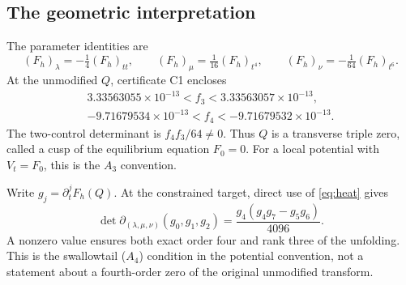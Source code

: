 \documentclass[11pt,a4paper]{article}
\numberwithin{equation}{section}
\theoremstyle{remark}\newtheorem{remark}[theorem]{Remark}
\begin{document}
\subsection{The geometric interpretation}
The parameter identities are
\begin{equation}
 (F_h)_\lambda=-\tfrac14(F_h)_{tt},\qquad
 (F_h)_\mu=\tfrac1{16}(F_h)_{t^4},\qquad
 (F_h)_\nu=-\tfrac1{64}(F_h)_{t^6}.\label{eq:heat}
\end{equation}
At the unmodified $Q$, certificate C1 encloses
\begin{equation}
 \begin{gathered}
 3.33563055\times10^{-13}<f_3<3.33563057\times10^{-13},\\
 -9.71679534\times10^{-13}<f_4<-9.71679532\times10^{-13}.
 \end{gathered}
\end{equation}
The two-control determinant is $f_4f_3/64\ne0$. Thus $Q$ is a transverse
triple zero, called a cusp of the equilibrium equation $F_0=0$.
For a local potential with $V_t=F_0$, this is the $A_3$ convention.

Write $g_j=\partial_t^jF_h(Q)$. At the constrained target, direct use of
\eqref{eq:heat} gives
\begin{equation}
 \det\partial_{(\lambda,\mu,\nu)}(g_0,g_1,g_2)
 =\frac{g_4(g_4g_7-g_5g_6)}{4096}.\label{eq:rank}
\end{equation}
A nonzero value ensures both exact order four and rank three of the
unfolding. This is the swallowtail ($A_4$) condition in the potential
convention, not a statement about a fourth-order zero of the original
unmodified transform.
\end{document}
